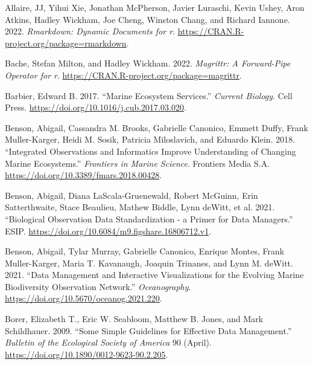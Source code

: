 \documentclass[
]{book}
\newlength{\cslhangindent}
\newlength{\cslentryspacingunit} %
\newenvironment{CSLReferences}[2] %
 {%
  \setlength{\parindent}{0pt}
  \ifodd #1
  \let\oldpar\par
  \def\par{\hangindent=\cslhangindent\oldpar}
  \fi
  \setlength{\parskip}{#2\cslentryspacingunit}
 }%
 {}
\begin{document}
\hypertarget{refs}{}
\begin{CSLReferences}{1}{0}
\leavevmode{}%
Allaire, JJ, Yihui Xie, Jonathan McPherson, Javier Luraschi, Kevin Ushey, Aron Atkins, Hadley Wickham, Joe Cheng, Winston Chang, and Richard Iannone. 2022. \emph{Rmarkdown: Dynamic Documents for r}. \url{https://CRAN.R-project.org/package=rmarkdown}.

\leavevmode{}%
Bache, Stefan Milton, and Hadley Wickham. 2022. \emph{Magrittr: A Forward-Pipe Operator for r}. \url{https://CRAN.R-project.org/package=magrittr}.

\leavevmode{}%
Barbier, Edward B. 2017. {``Marine Ecosystem Services.''} \emph{Current Biology}. Cell Press. \url{https://doi.org/10.1016/j.cub.2017.03.020}.

\leavevmode{}%
Benson, Abigail, Cassandra M. Brooks, Gabrielle Canonico, Emmett Duffy, Frank Muller-Karger, Heidi M. Sosik, Patricia Miloslavich, and Eduardo Klein. 2018. {``Integrated Observations and Informatics Improve Understanding of Changing Marine Ecosystems.''} \emph{Frontiers in Marine Science}. Frontiers Media S.A. \url{https://doi.org/10.3389/fmars.2018.00428}.

\leavevmode{}%
Benson, Abigail, Diana LaScala-Gruenewald, Robert McGuinn, Erin Satterthwaite, Stace Beaulieu, Mathew Biddle, Lynn deWitt, et al. 2021. {``Biological Observation Data Standardization - a Primer for Data Managers.''} ESIP. \url{https://doi.org/10.6084/m9.figshare.16806712.v1}.

\leavevmode{}%
Benson, Abigail, Tylar Murray, Gabrielle Canonico, Enrique Montes, Frank Muller-Karger, Maria T. Kavanaugh, Joaquin Trinanes, and Lynn M. deWitt. 2021. {``Data Management and Interactive Visualizations for the Evolving Marine Biodiversity Observation Network.''} \emph{Oceanography}. \url{https://doi.org/10.5670/oceanog.2021.220}.

\leavevmode{}%
Borer, Elizabeth T., Eric W. Seabloom, Matthew B. Jones, and Mark Schildhauer. 2009. {``Some Simple Guidelines for Effective Data Management.''} \emph{Bulletin of the Ecological Society of America} 90 (April). \url{https://doi.org/10.1890/0012-9623-90.2.205}.


\end{CSLReferences}
\end{document}
